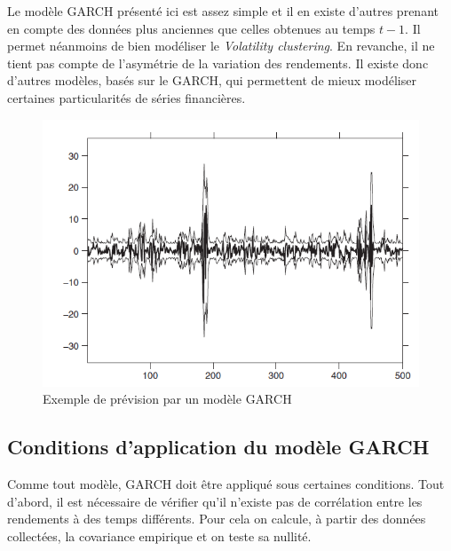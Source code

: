 			Le modèle GARCH présenté ici est assez simple et il en existe d'autres prenant en compte des données plus anciennes que celles obtenues au temps $t-1$. Il permet néanmoins de bien modéliser le \textit{Volatility clustering}. En revanche, il ne tient pas compte de l'asymétrie de la variation des rendements. Il existe donc d'autres modèles, basés sur le GARCH, qui permettent de mieux modéliser certaines particularités de séries financières.

			\begin{figure}[h]
				\center
				\includegraphics{AjustementParGarch.png}
				\caption{Exemple de prévision par un modèle GARCH}
				\label{ajustement_garch}
			\end{figure}


		\subsection{Conditions d'application du modèle GARCH}
		\label{subsubsection:condition-garch}
			Comme tout modèle, GARCH doit être appliqué sous certaines conditions. Tout d'abord, il est nécessaire de vérifier qu'il n'existe pas de corrélation entre les rendements à des temps différents.
			Pour cela on calcule, à partir des données collectées, la covariance empirique et on teste sa nullité. 

